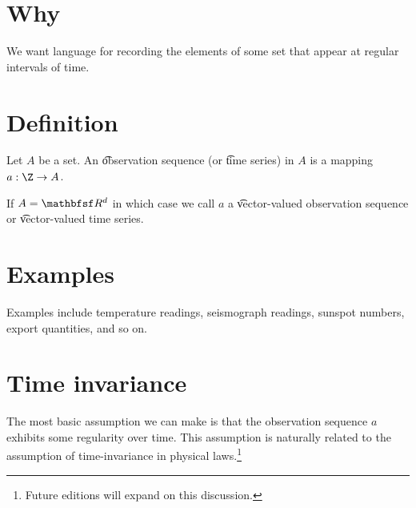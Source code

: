 
\section*{Why}

We want language for recording the elements of some set that appear at regular intervals of time.

\section*{Definition}

Let $A$ be a set.
An \t{observation sequence} (or \t{time series}) in $A$ is a mapping $a: \Z  \to A$.

If $A = \R ^d$ in which case we call $a$ a \t{vector-valued observation sequence} or \t{vector-valued time series}.

\section*{Examples}

Examples include temperature readings, seismograph readings, sunspot numbers, export quantities, and so on.

\section*{Time invariance}

The most basic assumption we can make is that the observation sequence $a$ exhibits some regularity over time.
This assumption is naturally related to the assumption of time-invariance in physical laws.\footnote{Future editions will expand on this discussion.}

\blankpage
